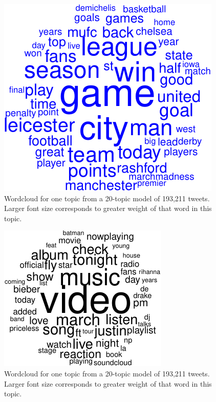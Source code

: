 \documentclass[12pt,]{article}
\begin{document}
\begin{figure}
\includegraphics[width=\textwidth]{lda-tutorial-2016_files/figure-latex/tw-wordcloud1-3.pdf}
\caption{Wordcloud for one topic from a 20-topic model of 193,211 tweets. Larger font size corresponds to greater weight of that word in this topic.\label{fig:twc3}}
\end{figure}

\begin{figure}
\includegraphics[width=\textwidth]{lda-tutorial-2016_files/figure-latex/tw-wordcloud1-4.pdf}
\caption{Wordcloud for one topic from a 20-topic model of 193,211 tweets. Larger font size corresponds to greater weight of that word in this topic.\label{fig:twc4}}
\end{figure}
\end{document}
